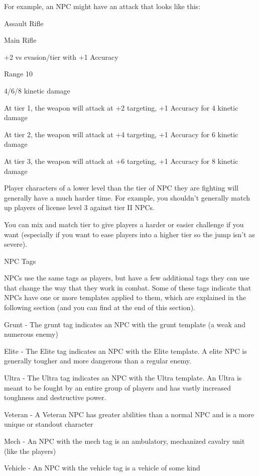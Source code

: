 For example, an NPC might have an attack that looks like this:


Assault Rifle

Main Rifle

+2 vs evasion/tier with +1 Accuracy

Range 10

4/6/8 kinetic damage


At tier 1, the weapon will attack at +2 targeting, +1 Accuracy for 4 kinetic damage

At tier 2, the weapon will attack at +4 targeting, +1 Accuracy for 6 kinetic damage

At tier 3, the weapon will attack at +6 targeting, +1 Accuracy for 8 kinetic damage


Player characters of a lower level than the tier of NPC they are fighting will generally have a much
harder time. For example, you shouldn't generally match up players of license level 3 against tier
II NPCs.





You can mix and match tier to give players a harder or easier challenge if you want (especially if
you want to ease players into a higher tier so the jump isn't as severe).


                                                 NPC Tags

NPCs use the same tags as players, but have a few additional tags they can use that change the
way that they work in combat. Some of these tags indicate that NPCs have one or more
templates applied to them, which are explained in the following section (and you can find at the
end of this section).


Grunt - The grunt tag indicates an NPC with the grunt template (a weak and numerous enemy)

Elite - The Elite tag indicates an NPC with the Elite template. A elite NPC is generally tougher
and more dangerous than a regular enemy.

Ultra - The Ultra tag indicates an NPC with the Ultra template. An Ultra is meant to be fought by
an entire group of players and has vastly increased toughness and destructive power.

Veteran - A Veteran NPC has greater abilities than a normal NPC and is a more unique or
standout character


Mech - An NPC with the mech tag is an ambulatory, mechanized cavalry unit (like the players)

Vehicle - An NPC with the vehicle tag is a vehicle of some kind

